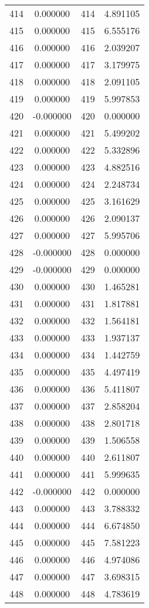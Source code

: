 \documentclass[12pt]{article}
\begin{document}
\begin{longtable}{@{}cccc@{}}
414 & 0.000000 & 414 & 4.891105 \\
415 & 0.000000 & 415 & 6.555176 \\
416 & 0.000000 & 416 & 2.039207 \\
417 & 0.000000 & 417 & 3.179975 \\
418 & 0.000000 & 418 & 2.091105 \\
419 & 0.000000 & 419 & 5.997853 \\
420 & -0.000000 & 420 & 0.000000 \\
421 & 0.000000 & 421 & 5.499202 \\
422 & 0.000000 & 422 & 5.332896 \\
423 & 0.000000 & 423 & 4.882516 \\
424 & 0.000000 & 424 & 2.248734 \\
425 & 0.000000 & 425 & 3.161629 \\
426 & 0.000000 & 426 & 2.090137 \\
427 & 0.000000 & 427 & 5.995706 \\
428 & -0.000000 & 428 & 0.000000 \\
429 & -0.000000 & 429 & 0.000000 \\
430 & 0.000000 & 430 & 1.465281 \\
431 & 0.000000 & 431 & 1.817881 \\
432 & 0.000000 & 432 & 1.564181 \\
433 & 0.000000 & 433 & 1.937137 \\
434 & 0.000000 & 434 & 1.442759 \\
435 & 0.000000 & 435 & 4.497419 \\
436 & 0.000000 & 436 & 5.411807 \\
437 & 0.000000 & 437 & 2.858204 \\
438 & 0.000000 & 438 & 2.801718 \\
439 & 0.000000 & 439 & 1.506558 \\
440 & 0.000000 & 440 & 2.611807 \\
441 & 0.000000 & 441 & 5.999635 \\
442 & -0.000000 & 442 & 0.000000 \\
443 & 0.000000 & 443 & 3.788332 \\
444 & 0.000000 & 444 & 6.674850 \\
445 & 0.000000 & 445 & 7.581223 \\
446 & 0.000000 & 446 & 4.974086 \\
447 & 0.000000 & 447 & 3.698315 \\
448 & 0.000000 & 448 & 4.783619 \\

\end{longtable}
\end{document}
